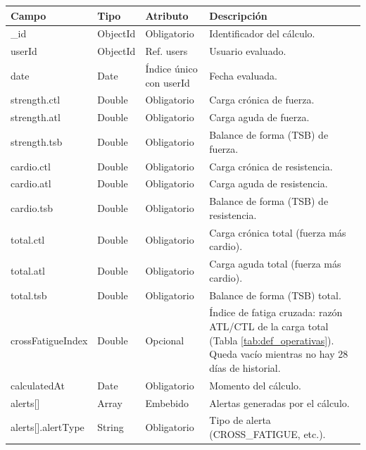 {\footnotesize
\renewcommand{\arraystretch}{1.2}
\begin{longtable}{|>{\raggedright\arraybackslash}p{4.7cm}|>{\raggedright\arraybackslash}p{1.8cm}|>{\raggedright\arraybackslash}p{2.3cm}|>{\raggedright\arraybackslash}p{5.4cm}|}
    \hline
    \rowcolor[HTML]{EFEFEF}
    \textbf{Campo} & \textbf{Tipo} & \textbf{Atributo} & \textbf{Descripción} \\ \hline
    \endhead
    \_id & ObjectId & Obligatorio & Identificador del cálculo. \\ \hline
    userId & ObjectId & Ref. users & Usuario evaluado. \\ \hline
    date & Date & Índice único con userId & Fecha evaluada. \\ \hline
    strength.\allowbreak ctl & Double & Obligatorio & Carga crónica de fuerza. \\ \hline
    strength.\allowbreak atl & Double & Obligatorio & Carga aguda de fuerza. \\ \hline
    strength.\allowbreak tsb & Double & Obligatorio & Balance de forma (TSB) de fuerza. \\ \hline
    cardio.\allowbreak ctl & Double & Obligatorio & Carga crónica de resistencia. \\ \hline
    cardio.\allowbreak atl & Double & Obligatorio & Carga aguda de resistencia. \\ \hline
    cardio.\allowbreak tsb & Double & Obligatorio & Balance de forma (TSB) de resistencia. \\ \hline
    total.\allowbreak ctl & Double & Obligatorio & Carga crónica total (fuerza más cardio). \\ \hline
    total.\allowbreak atl & Double & Obligatorio & Carga aguda total (fuerza más cardio). \\ \hline
    total.\allowbreak tsb & Double & Obligatorio & Balance de forma (TSB) total. \\ \hline
    crossFatigueIndex & Double & Opcional & Índice de fatiga cruzada: razón ATL/CTL de la carga total (Tabla \ref{tab:def_operativas}). Queda vacío mientras no hay 28 días de historial. \\ \hline
    calculatedAt & Date & Obligatorio & Momento del cálculo. \\ \hline
    alerts[]\allowbreak  & Array & Embebido & Alertas generadas por el cálculo. \\ \hline
    alerts[]\allowbreak .\allowbreak alertType & String & Obligatorio & Tipo de alerta (CROSS\_FATIGUE, etc.). \\ \hline

\end{longtable}}
